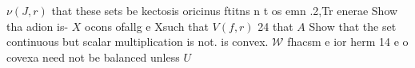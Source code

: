 $\scriptstyle\nu(J,r)$ that these sets be kectosis oricinus ftitns n t os emn .2,Tr enerae Show tha adion is- $\textstyle X$ ocons ofallg e Xsuch that $V(f,r)$ 24 that $\textstyle A$ Show that the set continuous but scalar multiplication is not. is convex. $\mathcal{W}$ fhacsm e ior herm 14 e o covexa need not be balanced unless $U$
